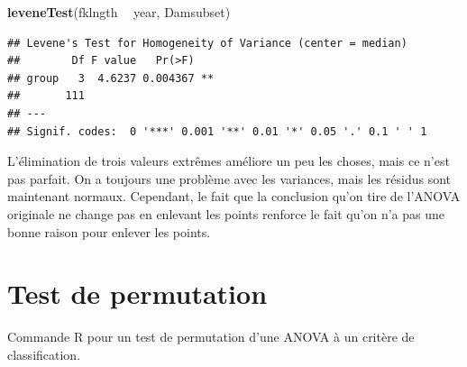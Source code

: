 \documentclass[12pt,]{book}
\newenvironment{Shaded}{\begin{snugshade}}{\end{snugshade}}
\newcommand{\KeywordTok}[1]{\textcolor[rgb]{0.27,0.27,0.27}{\textbf{#1}}}
\newcommand{\NormalTok}[1]{#1}
\newcommand{\OperatorTok}[1]{\textcolor[rgb]{0.43,0.43,0.43}{\textbf{#1}}}
\newcommand{\StringTok}[1]{\textcolor[rgb]{0.5,0.5,0.5}{#1}}
\begin{document}
\begin{Shaded}
\begin{Highlighting}[]
\KeywordTok{leveneTest}\NormalTok{(fklngth }\OperatorTok{~}\StringTok{ }\NormalTok{year, Damsubset)}
\end{Highlighting}
\end{Shaded}

\begin{verbatim}
## Levene's Test for Homogeneity of Variance (center = median)
##        Df F value   Pr(>F)   
## group   3  4.6237 0.004367 **
##       111                    
## ---
## Signif. codes:  0 '***' 0.001 '**' 0.01 '*' 0.05 '.' 0.1 ' ' 1
\end{verbatim}

L'élimination de trois valeurs extrêmes améliore un peu les choses, mais ce n'est pas parfait. On a toujours une problème avec les variances, mais les résidus sont maintenant normaux. Cependant, le fait que la conclusion qu'on tire de l'ANOVA originale ne change pas en enlevant les points renforce le fait qu'on n'a pas une bonne raison pour enlever les points.

\hypertarget{test-de-permutation}{%
\section{Test de permutation}\label{test-de-permutation}}

Commande R pour un test de permutation d'une ANOVA à un critère de classification.
\end{document}
